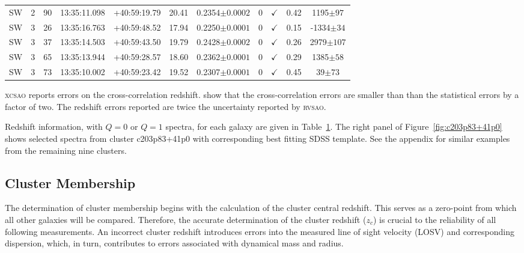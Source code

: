 \begin{table}
\begin{tabular}{ccccccccccc}
		SW & 2 & 90 & 13:35:11.098 & +40:59:19.79 & 20.41 & 0.2354$\pm{0.0002}$ & 0 & $\checkmark$ & 0.42 & 1195$\pm{97}$ \\
		SW & 3 & 26 & 13:35:16.763 & +40:59:48.52 & 17.94 & 0.2250$\pm{0.0001}$ & 0 & $\checkmark$ & 0.15 & -1334$\pm{34}$ \\
		SW & 3 & 37 & 13:35:14.503 & +40:59:43.50 & 19.79 & 0.2428$\pm{0.0002}$ & 0 & $\checkmark$ & 0.26 & 2979$\pm{107}$ \\
		SW & 3 & 65 & 13:35:13.944 & +40:59:28.57 & 18.60 & 0.2362$\pm{0.0001}$ & 0 & $\checkmark$ & 0.29 & 1385$\pm{58}$ \\
		SW & 3 & 73 & 13:35:10.002 & +40:59:23.42 & 19.52 & 0.2307$\pm{0.0001}$ & 0 & $\checkmark$ & 0.45 & 39$\pm{73}$ \\
		\hline 
	\end{tabular}
	\label{tbl:c203p83+41p0} 
\end{table}

\textsc{xcsao} reports errors on the cross-correlation redshift. \cite{Quintana2000} show that the cross-correlation errors are smaller than than the statistical errors by a factor of two. The redshift errors reported are twice the uncertainty reported by \textsc{rvsao}. 

Redshift information, with $Q=0$ or $Q=1$ spectra, for each galaxy are given in Table~\ref{tbl:c203p83+41p0}. The right panel of Figure~\ref{fig:c203p83+41p0} shows selected spectra from cluster c203p83+41p0 with corresponding best fitting SDSS template. See the appendix for similar examples from the remaining nine clusters.

\subsection{Cluster Membership}\label{sec:cluster membership} The determination of cluster membership begins with the calculation of the cluster central redshift. This serves as a zero-point from which all other galaxies will be compared. Therefore, the accurate determination of the cluster redshift ($z_c$) is crucial to the reliability of all following measurements. An incorrect cluster redshift introduces errors into the measured line of sight velocity (LOSV) and corresponding dispersion, which, in turn, contributes to errors associated with dynamical mass and radius. 

